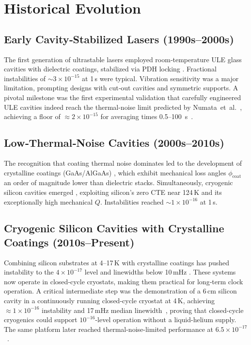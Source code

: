 \documentclass[12pt,a4paper]{article}
\begin{document}
\section{Historical Evolution}\label{sec:evolution}
\subsection{Early Cavity‑Stabilized Lasers (1990s–2000s)}
The first generation of ultrastable lasers employed room‑temperature ULE glass cavities with dielectric coatings, stabilized via PDH locking \cite{drever1983,young1999}. Fractional instabilities of ${\sim}3\times10^{-15}$ at 1 s were typical. Vibration sensitivity was a major limitation, prompting designs with cut‑out cavities \cite{webster2007} and symmetric supports. A pivotal milestone was the first experimental validation that carefully engineered ULE cavities indeed reach the thermal-noise limit predicted by Numata~et~al.~\cite{numata2004}, achieving a floor of $\approx 2\times10^{-15}$ for averaging times 0.5–100~s~\cite{webster2008}.

\subsection{Low‑Thermal‑Noise Cavities (2000s–2010s)}
The recognition that coating thermal noise dominates led to the development of crystalline coatings (GaAs/AlGaAs) \cite{cole2013}, which exhibit mechanical loss angles $\phi_{\mathrm{coat}}$ an order of magnitude lower than dielectric stacks. Simultaneously, cryogenic silicon cavities emerged \cite{kessler2012}, exploiting silicon's zero CTE near 124 K and its exceptionally high mechanical $Q$. Instabilities reached ${\sim}1\times10^{-16}$ at 1 s.

\subsection{Cryogenic Silicon Cavities with Crystalline Coatings (2010s–Present)}
Combining silicon substrates at 4–17 K with crystalline coatings has pushed instability to the $4\times10^{-17}$ level \cite{chen2025,lee2026} and linewidths below 10 mHz \cite{matei2017}. These systems now operate in closed‑cycle cryostats, making them practical for long‑term clock operation. A critical intermediate step was the demonstration of a 6 cm silicon cavity in a continuously running closed-cycle cryostat at 4 K, achieving $\approx 1\times10^{-16}$ instability and 17 mHz median linewidth~\cite{zhang2017}, proving that closed-cycle cryogenics could support $10^{-16}$-level operation without a liquid-helium supply. The same platform later reached thermal-noise-limited performance at $6.5\times10^{-17}$~\cite{robinson2019}.
\end{document}
